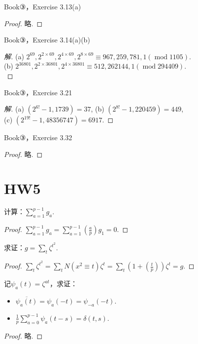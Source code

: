 \begin{exercise}
    Book③，Exercise 3.13(a)
\end{exercise}
\begin{proof}
    略.
\end{proof}

\begin{exercise}
    Book③，Exercise 3.14(a)(b)
\end{exercise}
\begin{proof}[解]
 (a) $2^{69},2^{2\times69},2^{4\times69},2^{8\times69}\equiv967,259,781,1(\operatorname{mod}1105)$.\\
 (b) $2^{36801},2^{2\times36801},2^{4\times36801}\equiv512,262144,1(\operatorname{mod}294409)$.\\
\end{proof}

\begin{exercise}
    Book③，Exercise 3.21
\end{exercise}
\begin{proof}[解]
    (a) $(2^{6!}-1,1739)=37$, (b) $(2^{8!}-1,220459)=449$,\\
    (c) $(2^{19!}-1,48356747)=6917$.
\end{proof}

\begin{exercise}
    Book③，Exercise 3.32
\end{exercise}
\begin{proof}
    略.
\end{proof}

\section{HW5}
\begin{exercise}
    计算：$\sum_{a=1}^{p-1}g_a$.
\end{exercise}
\begin{proof}
    $\sum_{a=1}^{p-1}g_a=\sum_{a=1}^{p-1}\left( \frac{a}{p} \right)g_1=0$.
\end{proof}

\begin{exercise}
    求证：$g=\sum_{t}\zeta^{t^2}$.
\end{exercise}
\begin{proof}
    $\sum_{t}\zeta^{t^2}=\sum_{t}N(x^2\equiv t)\zeta^t=\sum_{t}\left( 1+\left( \frac{t}{p} \right) \right)\zeta^t=g$.
\end{proof}

\begin{exercise}\label{5.3}
    记$\psi_a(t)=\zeta^{at}$，求证：
    \begin{itemize}
        \item[(1)] $\overline{\psi_a(t)}=\psi_a(-t)=\psi_{-a}(-t)$.
        \item[(2)] $\displaystyle\frac{1}{p}\sum_{a=0}^{p-1}\psi_a(t-s)=\delta(t,s)$.
    \end{itemize}
\end{exercise}
\begin{proof}
    略.
\end{proof}

